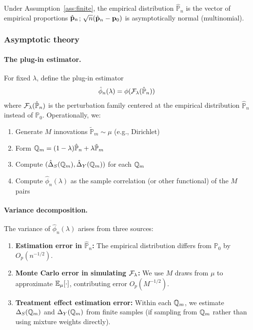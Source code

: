\documentclass{article}
\newcommand{\PP}{\mathbb{P}}
\begin{document}
Under Assumption~\ref{ass:finite}, the empirical distribution $\hat{\PP}_n$ is the vector of empirical proportions $\hat{\mathbf{p}}_n$; $\sqrt{n}(\hat{\mathbf{p}}_n - \mathbf{p}_0)$ is asymptotically normal (multinomial).

\subsubsection{Asymptotic theory}

\paragraph{The plug-in estimator.}
For fixed $\lambda$, define the plug-in estimator
\[
    \hat{\phi}_n(\lambda) = \phi(\cF_\lambda(\hat{\PP}_n))
\]
where $\cF_\lambda(\hat{\PP}_n)$ is the perturbation family centered at the
empirical distribution $\hat{\PP}_n$ instead of $\PP_0$. Operationally, we:
\begin{enumerate}
    \item Generate $M$ innovations $\tilde{\PP}_m \sim \mu$ (e.g., Dirichlet)
    \item Form $\Q_m = (1-\lambda)\hat{\PP}_n + \lambda\tilde{\PP}_m$
    \item Compute $(\hat{\Delta}_S(\mathbb{Q}_m), \hat{\Delta}_Y(\mathbb{Q}_m))$ for each $\mathbb{Q}_m$
    \item Compute $\hat{\phi}_n(\lambda)$ as the sample correlation (or other functional)
          of the $M$ pairs
\end{enumerate}

\paragraph{Variance decomposition.}
The variance of $\hat{\phi}_n(\lambda)$ arises from three sources:
\begin{enumerate}
    \item \textbf{Estimation error in $\hat{\PP}_n$:} The empirical distribution
          differs from $\PP_0$ by $O_p(n^{-1/2})$.
    \item \textbf{Monte Carlo error in simulating $\mathcal{F}_\lambda$:} We use $M$ draws
          from $\mu$ to approximate $\mathbb{E}_\mu[\cdot]$, contributing error $O_p(M^{-1/2})$.
    \item \textbf{Treatment effect estimation error:} Within each $\mathbb{Q}_m$, we estimate
          $\Delta_S(\mathbb{Q}_m)$ and $\Delta_Y(\mathbb{Q}_m)$ from finite samples (if sampling
          from $\mathbb{Q}_m$ rather than using mixture weights directly).
\end{enumerate}
\end{document}
